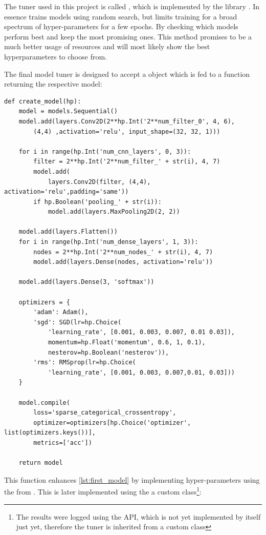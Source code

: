 The tuner used in this project is called  \cite{Li2018}, which is implemented by the library  \cite{Google2019a}.
In essence  trains models using random search, but limits training for a broad spectrum of hyper-parameters for a few epochs.
By checking which models perform best and keep the most promising ones.
This method promises to be a much better usage of resources and will most likely show the best hyperparameters to choose from.

The final model tuner is designed to accept a  object which is fed to a function returning the respective model:

\begin{lstlisting}
def create_model(hp):
    model = models.Sequential()
    model.add(layers.Conv2D(2**hp.Int('2**num_filter_0', 4, 6),
        (4,4) ,activation='relu', input_shape=(32, 32, 1)))

    for i in range(hp.Int('num_cnn_layers', 0, 3)):
        filter = 2**hp.Int('2**num_filter_' + str(i), 4, 7)
        model.add(
            layers.Conv2D(filter, (4,4), activation='relu',padding='same'))
        if hp.Boolean('pooling_' + str(i)):
            model.add(layers.MaxPooling2D(2, 2))

    model.add(layers.Flatten())
    for i in range(hp.Int('num_dense_layers', 1, 3)):
        nodes = 2**hp.Int('2**num_nodes_' + str(i), 4, 7)
        model.add(layers.Dense(nodes, activation='relu'))
    
    model.add(layers.Dense(3, 'softmax'))

    optimizers = {
        'adam': Adam(),
        'sgd': SGD(lr=hp.Choice(
            'learning_rate', [0.001, 0.003, 0.007, 0.01 0.03]),
            momentum=hp.Float('momentum', 0.6, 1, 0.1),
            nesterov=hp.Boolean('nesterov')),
        'rms': RMSprop(lr=hp.Choice(
            'learning_rate', [0.001, 0.003, 0.007,0.01, 0.03]))
    }

    model.compile(
        loss='sparse_categorical_crossentropy',
        optimizer=optimizers[hp.Choice('optimizer', list(optimizers.keys())],
        metrics=['acc'])

    return model
\end{lstlisting}

This function enhances \ref{lst:first_model} by implementing hyper-parameters using the  from .
This is later implemented using the a custom class\footnote{The results were logged using the  API, which is not yet implemented by  itself just yet, therefore the tuner is inherited from a custom class}:

